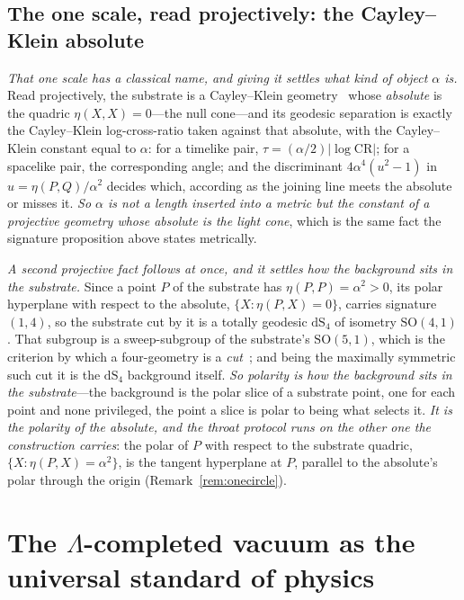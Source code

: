 \documentclass[11pt,a4paper]{article}
\theoremstyle{definition}
\begin{document}
\subsection{The one scale, read projectively: the Cayley--Klein absolute}

\emph{That one scale has a classical name, and giving it settles what kind of object $\alpha$ is.}
Read projectively, the substrate is a Cayley--Klein
geometry~\cite{Cayley1859,Klein1871} whose \emph{absolute} is the quadric $\eta(X,X)=0$---the null
cone---and its geodesic separation is exactly the Cayley--Klein log-cross-ratio taken against that
absolute, with the Cayley--Klein constant equal to $\alpha$: for a timelike pair,
$\tau=(\alpha/2)\lvert\log\mathrm{CR}\rvert$; for a spacelike pair, the corresponding angle; and the
discriminant $4\alpha^{4}(u^{2}-1)$ in $u=\eta(P,Q)/\alpha^{2}$ decides which, according as the joining
line meets the absolute or misses it. \emph{So $\alpha$ is not a length inserted
into a metric but the constant of a projective geometry whose absolute is the light cone}, which is the
same fact the signature proposition above states metrically.

\emph{A second projective fact follows at once, and it settles how the background sits in the
substrate.} Since a point $P$ of the substrate has $\eta(P,P)=\alpha^{2}>0$, its polar hyperplane with respect to
the absolute, $\{X:\eta(P,X)=0\}$, carries signature $(1,4)$, so the substrate cut by it is a totally geodesic
$\mathrm{dS}_{4}$ of isometry $\mathrm{SO}(4,1)$. That subgroup is a
sweep-subgroup of the substrate's $\mathrm{SO}(5,1)$, which is the criterion by which a four-geometry
is a \emph{cut}~\cite{JanzenRange}; and being the maximally symmetric such cut it is the
$\mathrm{dS}_{4}$ background itself. \emph{So polarity is how the background sits in the
substrate}---the background is the polar slice of a substrate point, one for each point and none
privileged, the point a slice is polar to being what selects it. \emph{It is the polarity of the absolute,
and the throat protocol runs on the other one the construction carries}: the polar of $P$ with respect to
the substrate quadric, $\{X:\eta(P,X)=\alpha^{2}\}$, is the tangent hyperplane at $P$, parallel to the
absolute's polar through the origin (Remark~\ref{rem:onecircle}).

\section{The $\Lambda$-completed vacuum as the universal standard of
physics}\label{sec:standard}
\end{document}
